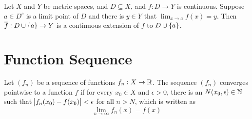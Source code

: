 \begin{theorem}
    Let $X$ and $Y$ be metric spaces, and $D \subseteq X$, and $f: D\rightarrow Y$ is continuous. Suppose $a \in D^c$ is a limit point of $D$ and there is $y \in Y$ that $\lim_{x \rightarrow a} f(x) = y$. Then $\overline{f}: D \cup \set{a} \rightarrow Y$ is a continuous extension of $f$ to $D \cup \set{a}$.
\end{theorem}






\section{Function Sequence}

\begin{definition}
    Let $(f_n)$ be a sequence of functions $f_n : X \rightarrow \mathbb{R}$. The sequence $(f_n)$ converges pointwise to a function $f$ if for every $x_0 \in X$ and $\epsilon > 0$, there is an $N(x_0, \epsilon) \in \mathbb{N}$ such that $\abs{f_n (x_0) - f(x_0)} < \epsilon$ for all $n > N$, which is written as
    \begin{equation}
        \lim_{n \rightarrow \infty} f_n (x) = f(x)
    \end{equation}
\end{definition}






















































